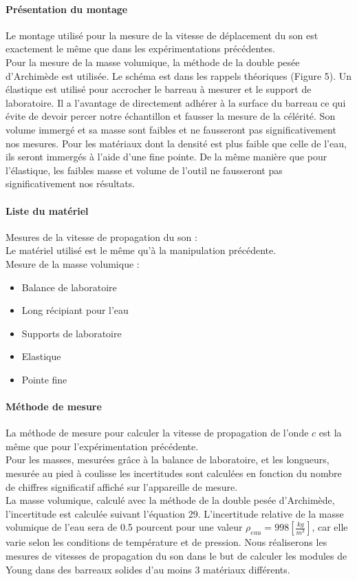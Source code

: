 \paragraph{Présentation du montage}
Le montage utilisé pour la mesure de la vitesse de déplacement du son est exactement le 
même que dans les expérimentations précédentes.\\
Pour la mesure de la masse volumique, la méthode de la double pesée d'Archimède est utilisée. Le 
schéma est dans les rappels théoriques (Figure 5). %
Un élastique est utilisé pour accrocher le barreau à mesurer et le support de laboratoire. Il a l'avantage
de directement adhérer à la surface du barreau ce qui évite de devoir percer notre échantillon et 
fausser la mesure de la célérité. Son volume immergé et sa masse sont faibles et ne fausseront pas 
significativement nos mesures. Pour les matériaux dont la densité est plus faible que celle de l'eau, 
ils seront immergés à l'aide d'une fine pointe. De la même manière que pour l'élastique, les faibles
masse et volume de l'outil ne fausseront pas significativement nos résultats. 
\paragraph{Liste du matériel}
Mesures de la vitesse de propagation du son :\\
Le matériel utilisé est le même qu'à la manipulation précédente.\\
Mesure de la masse volumique :
\begin{itemize}
    \item Balance de laboratoire
    \item Long récipiant pour l'eau
    \item Supports de laboratoire
    \item Elastique
    \item Pointe fine
\end{itemize}
\paragraph{Méthode de mesure}
La méthode de mesure pour calculer la vitesse de propagation de l'onde $c$ est la même que pour 
l'expérimentation précédente.\\
Pour les masses, mesurées grâce à la balance de laboratoire, et les longueurs, mesurée au pied à 
coulisse les incertitudes sont calculées en fonction du nombre de chiffres significatif affiché sur 
l'appareille de mesure. \\
La masse volumique, calculé avec la méthode de la double pesée d'Archimède, l'incertitude est 
calculée suivant l'équation 29. L'incertitude relative de la masse volumique de l'eau sera de 0.5 pourcent
pour une valeur $\rho_{eau}=998[\frac{kg}{m^3}]$, car elle varie selon les conditions de température 
et de pression. Nous réaliserons les mesures de vitesses de 
propagation du son dans le but de calculer les modules de Young dans des
barreaux solides 
d'au moins 3 matériaux différents.

